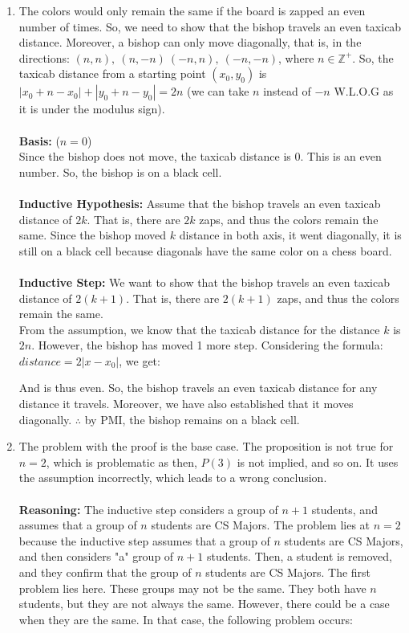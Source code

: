 \documentclass[a4paper]{article}
\begin{document}
\begin{enumerate}
\item The colors would only remain the same if the board is zapped an even number of times. So, we need to show that the bishop travels an even taxicab distance. Moreover, a bishop can only move diagonally, that is, in the directions: $(n, n),\ (n, -n)\ (-n, n),\ (-n, -n)$, where $n \in \mathbb{Z}^+$. So, the taxicab distance from a starting point $(x_0, y_0)$ is $|x_0 + n - x_0| + |y_0 + n - y_0| = 2n$ (we can take $n$ instead of $-n$ W.L.O.G as it is under the modulus sign).\\
\\
\textbf{Basis:} ($n=0$)\\
Since the bishop does not move, the taxicab distance is 0. This is an even number. So, the bishop is on a black cell.\\
\\
\textbf{Inductive Hypothesis:} Assume that the bishop travels an even taxicab distance of $2k$. That is, there are $2k$ zaps, and thus the colors remain the same. Since the bishop moved $k$ distance in both axis, it went diagonally, it is still on a black cell because diagonals have the same color on a chess board.\\
\\
\textbf{Inductive Step:} We want to show that the bishop travels an even taxicab distance of $2(k+1)$. That is, there are $2(k+1)$ zaps, and thus the colors remain the same.\\
From the assumption, we know that the taxicab distance for the distance $k$ is $2n$. However, the bishop has moved 1 more step. Considering the formula: $distance = 2|x - x_0|$, we get:
And is thus even. So, the bishop travels an even taxicab distance for any distance it travels. Moreover, we have also established that it moves diagonally. $\therefore$ by PMI, the bishop remains on a black cell.\\
\item The problem with the proof is the base case. The proposition is not true for $n=2$, which is problematic as then, $P(3)$ is not implied, and so on. It uses the assumption incorrectly, which leads to a wrong conclusion.\\
\\
\textbf{Reasoning:} The inductive step considers a group of $n + 1$ students, and assumes that a group of $n$ students are CS Majors. The problem lies at $n=2$ because the inductive step assumes that a group of $n$ students are CS Majors, and then considers "a" group of $n+1$ students. Then, a student is removed, and they confirm that the group of $n$ students are CS Majors. The first problem lies here. These groups may not be the same. They both have $n$ students, but they are not always the same. However, there could be a case when they are the same. In that case, the following problem occurs:\\

\end{enumerate}
\end{document}
